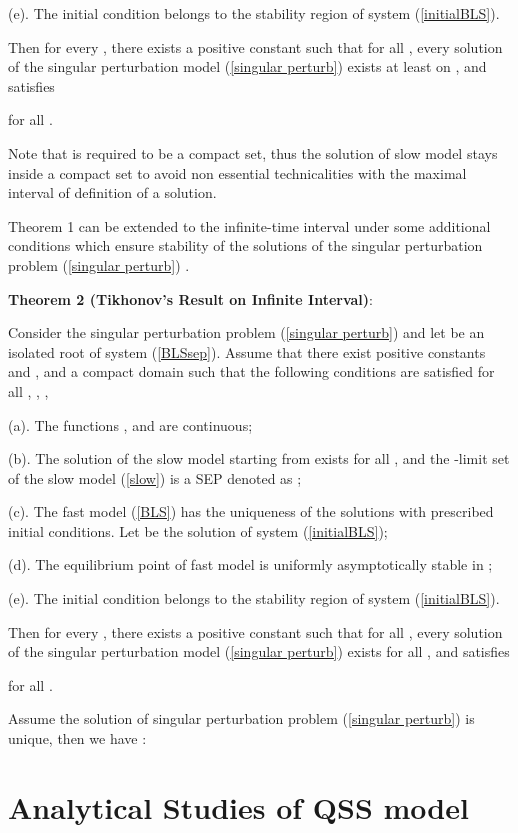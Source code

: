 \documentclass[journal]{IEEEtran}
\begin{document}
(e). The initial condition  belongs to the stability region  of system (\ref{initialBLS}).

Then for every , there exists a positive constant  such that for all , every solution  of the singular perturbation model (\ref{singular perturb}) exists at least on , and satisfies

for all .

Note that  is required to be a compact set, thus the solution of slow model stays inside a compact set to avoid non essential technicalities with the maximal interval of definition of a solution\cite{Lobry:article2}.

Theorem 1 can be extended to the infinite-time interval under some additional conditions which ensure stability of the solutions of the singular perturbation problem (\ref{singular perturb}) \cite{Lobry:article2}.

\noindent\textbf{Theorem 2 (Tikhonov's Result on Infinite Interval)}\cite{Khalil:book}\cite{Lobry:article2}:

Consider the singular perturbation problem (\ref{singular perturb}) and let  be an isolated root of system (\ref{BLSsep}). Assume that there exist positive constants  and , and a compact domain  such that the following conditions are satisfied for all , , , 

(a). The functions ,  and  are continuous;

(b). The solution  of the slow model starting from  exists for all , and the -limit set of the slow model (\ref{slow}) is a SEP denoted as ;

(c). The fast model (\ref{BLS}) has the uniqueness of the solutions with prescribed initial conditions. Let  be the solution of system (\ref{initialBLS});

(d). The equilibrium point  of fast model is uniformly asymptotically stable in ;

(e). The initial condition  belongs to the stability region  of system (\ref{initialBLS}).

Then for every , there exists a positive constant  such that for all , every solution  of the singular perturbation model (\ref{singular perturb}) exists for all , and satisfies

for all .

Assume the solution of singular perturbation problem (\ref{singular perturb})  is unique, then we have \cite{Lobry:article2}\cite{Lobry:article}:


\section{Analytical Studies of QSS model}\label{analyticalstudies}
\end{document}
